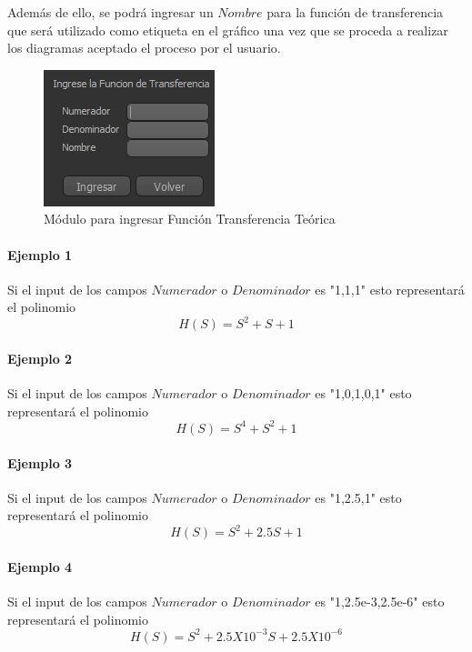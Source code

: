 Además de ello, se podrá ingresar un $Nombre$ para la función de transferencia que será utilizado como etiqueta en el gráfico una vez que se proceda a realizar los diagramas aceptado el proceso por el usuario.

\begin{figure}[!htb] 
    \centering 
    \includegraphics [scale=0.8]{../EJ2/LatexScreenshots/plotToolTransferFunctionInput.png} 
    \caption{Módulo para ingresar Función Transferencia Teórica}
    \label{fig:transferFunctionInputPlotTool}
\end{figure}

\paragraph{Ejemplo 1}

Si el input de los campos $Numerador$ o $Denominador$ es "1,1,1" esto representará el polinomio  $$H(S) = S^2 + S + 1 $$

\paragraph{Ejemplo 2}

Si el input de los campos $Numerador$ o $Denominador$ es "1,0,1,0,1" esto representará el polinomio  $$H(S) = S^4 + S^2 + 1 $$

\paragraph{Ejemplo 3}

Si el input de los campos $Numerador$ o $Denominador$ es "1,2.5,1" esto representará el polinomio  $$H(S) = S^2 + 2.5S + 1 $$

\paragraph{Ejemplo 4}

Si el input de los campos $Numerador$ o $Denominador$ es "1,2.5e-3,2.5e-6" esto representará el polinomio  $$H(S) = S^2 + 2.5X10^{-3}S + 2.5X10^{-6} $$

